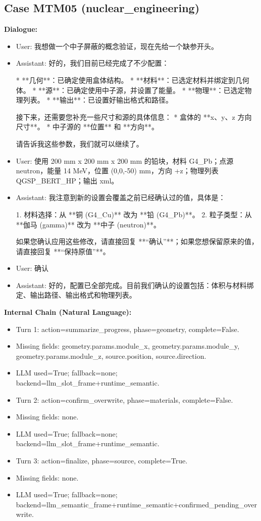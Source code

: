 \documentclass[11pt]{ctexart}
\begin{document}
\subsection{Case MTM05 (nuclear\_engineering)}
\textbf{Dialogue:}
\begin{itemize}
\item User: 我想做一个中子屏蔽的概念验证，现在先给一个缺参开头。
\item Assistant: 好的，我们目前已经完成了不少配置：

*   **几何**：已确定使用盒体结构。
*   **材料**：已选定材料并绑定到几何体。
*   **源**：已确定使用中子源，并设置了能量。
*   **物理**：已选定物理列表。
*   **输出**：已设置好输出格式和路径。

接下来，还需要您补充一些尺寸和源的具体信息：
*   盒体的 **x、y、z 方向尺寸**。
*   中子源的 **位置** 和 **方向**。

请告诉我这些参数，我们就可以继续了。
\item User: 使用 200 mm x 200 mm x 200 mm 的铅块，材料 G4\_Pb；点源 neutron，能量 14 MeV，位置 (0,0,-50) mm，方向 +z；物理列表 QGSP\_BERT\_HP；输出 xml。
\item Assistant: 我注意到新的设置会覆盖之前已经确认过的值，具体是：

1.  材料选择：从 **铜 (G4\_Cu)** 改为 **铅 (G4\_Pb)**。
2.  粒子类型：从 **伽马 (gamma)** 改为 **中子 (neutron)**。

如果您确认应用这些修改，请直接回复 **“确认”**；如果您想保留原来的值，请直接回复 **“保持原值”**。
\item User: 确认
\item Assistant: 好的，配置已全部完成。目前我们确认的设置包括：体积与材料绑定、输出路径、输出格式和物理列表。
\end{itemize}
\textbf{Internal Chain (Natural Language):}
\begin{itemize}
\item Turn 1: action=summarize\_progress, phase=geometry, complete=False.
\item Missing fields: geometry.params.module\_x, geometry.params.module\_y, geometry.params.module\_z, source.position, source.direction.
\item LLM used=True; fallback=none; backend=llm\_slot\_frame+runtime\_semantic.
\item Turn 2: action=confirm\_overwrite, phase=materials, complete=False.
\item Missing fields: none.
\item LLM used=True; fallback=none; backend=llm\_slot\_frame+runtime\_semantic.
\item Turn 3: action=finalize, phase=source, complete=True.
\item Missing fields: none.
\item LLM used=True; fallback=none; backend=llm\_semantic\_frame+runtime\_semantic+confirmed\_pending\_overwrite.
\end{itemize}
\end{document}
